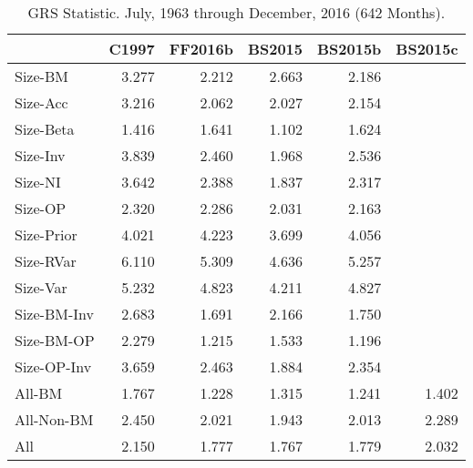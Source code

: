 
\begin{table}[!ht]
\centering
\caption{GRS Statistic. \footnotesize{July, 1963 through December, 2016 (642 Months).}}
\begin{tabular}{lrrrrr}
  \toprule
     & C1997  & FF2016b  & BS2015  & BS2015b  & BS2015c  \\
  \midrule

  
    Size-BM  & 3.277  & 2.212  & 2.663  & 2.186  &   \\
  
    Size-Acc  & 3.216  & 2.062  & 2.027  & 2.154  &   \\
  
    Size-Beta  & 1.416  & 1.641  & 1.102  & 1.624  &   \\
  
    Size-Inv  & 3.839  & 2.460  & 1.968  & 2.536  &   \\
  
    Size-NI  & 3.642  & 2.388  & 1.837  & 2.317  &   \\
  
    Size-OP  & 2.320  & 2.286  & 2.031  & 2.163  &   \\
  
    Size-Prior  & 4.021  & 4.223  & 3.699  & 4.056  &   \\
  
    Size-RVar  & 6.110  & 5.309  & 4.636  & 5.257  &   \\
  
    Size-Var  & 5.232  & 4.823  & 4.211  & 4.827  &   \\
  
    Size-BM-Inv  & 2.683  & 1.691  & 2.166  & 1.750  &   \\
  
    Size-BM-OP  & 2.279  & 1.215  & 1.533  & 1.196  &   \\
  
    Size-OP-Inv  & 3.659  & 2.463  & 1.884  & 2.354  &   \\
  
    All-BM  & 1.767  & 1.228  & 1.315  & 1.241  & 1.402  \\
  
    All-Non-BM  & 2.450  & 2.021  & 1.943  & 2.013  & 2.289  \\
  
    All  & 2.150  & 1.777  & 1.767  & 1.779  & 2.032  \\
  

  \bottomrule
\end{tabular}
\label{tbl:GRS}
\end{table}